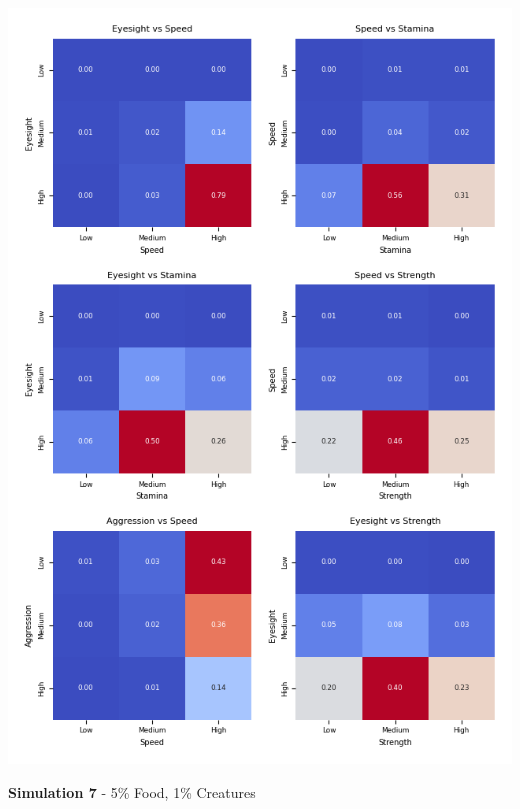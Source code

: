 \documentclass{article}
\begin{document}
\begin{center}
    \includegraphics[scale=0.9]{tests/2.6_confusion_matrices.png}
\end{center}
\textbf{Simulation 7} - 5\% Food, 1\% Creatures
\end{document}
